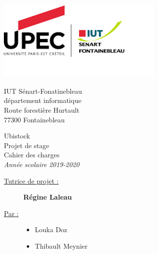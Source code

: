 \documentclass[a4paper, 12pt]{report}
\title{}
\author{
	Louka Doz
	\and 
	Thibault Meynier
}
\date{\raggedleft \today}
\begin{document}
	\makeatletter
	\begin{titlepage}

		\begin{flushleft}
			\begin{minipage}{4cm}
				\includegraphics[height=4cm]{img/logo_iut}
			\end{minipage}
			\hfill
			\begin{minipage}{5cm}
				\begin{flushright}
		        	\small IUT Sénart-Fonatinebleau\\
		        	département informatique\\
		        	Route forestière Hurtault\\
		        	77300 Fontainebleau\\
				\end{flushright}
			\end{minipage}
		\end{flushleft}

		\vfill

		\begin{center}
	        \vspace*{3cm}%
	        {\HUGE Ubistock}\\[0.5cm]
	        {\huge Projet de stage}\\[0.5cm]
	        {\Large Cahier des charges}\\[0.5cm]
        	{\large \textit{Année scolaire 2019-2020}}\\[1cm]
	    \end{center}
	    \vfill
        \begin{raggedright}
	        \begin{description}
	        	\item[\large \underline{Tutrice de projet :}] \large \textbf{Régine Laleau}\\[1cm]
	        	\item[\underline{Par :}] 
		        	\begin{itemize}
			        		\item Louka Doz
			        		\item Thibault Meynier
			        \end{itemize}
	        \end{description}
        \end{raggedright}        
	    \let\newpage\relax%
	\end{titlepage}
	\makeatother
\end{document}
